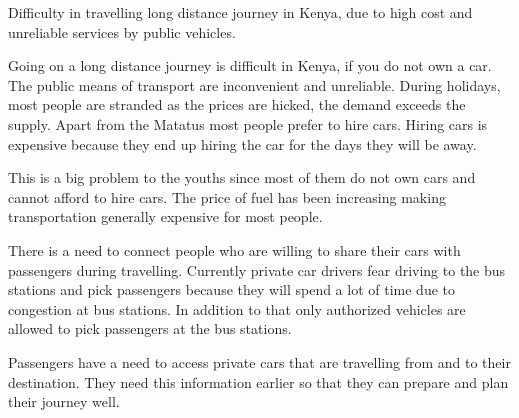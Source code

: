 Difficulty in travelling long distance journey in Kenya, due to high cost and unreliable services by public vehicles.

Going on a long distance journey is difficult in Kenya, if you do not own a car. The public means of transport are inconvenient and unreliable. During holidays, most people are stranded as the prices are hicked, the demand exceeds the supply. Apart from the Matatus most people prefer to hire cars. Hiring cars is expensive because they end up hiring the car for the days they will be away.

This is a big problem to the youths since most of them do not own cars and cannot afford to hire cars. The price of fuel has been increasing making transportation generally expensive for most people.

There is a need to connect people who are willing to share their cars with passengers during travelling. Currently private car drivers fear driving to the bus stations and pick passengers because they will spend a lot of time due to congestion at bus stations. In addition to that only authorized vehicles are allowed to pick passengers at the bus stations.

Passengers have a need to access private cars that are travelling from and to their destination. They need this information earlier so that they can prepare and plan their journey well.